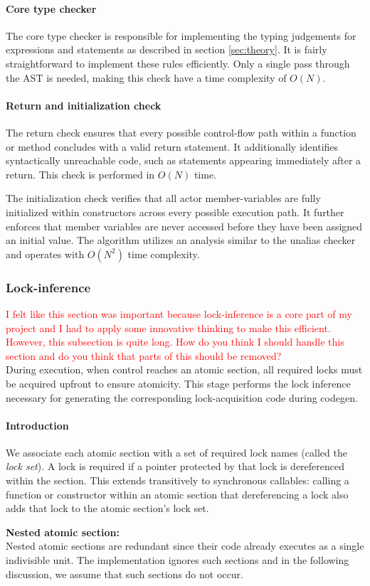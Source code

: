 \documentclass[a4paper,12pt,fleqn]{article}
\begin{document}
\paragraph{Core type checker\\}
The core type checker is responsible for implementing the typing judgements for expressions and statements as described in section \ref{sec:theory}. It is fairly straightforward to implement these rules efficiently. Only a single pass through the AST is needed, making this check have a time complexity of $O(N)$.
\paragraph{Return and initialization check\\}
The return check ensures that every possible control-flow path within a function or method concludes with a valid return statement. It additionally identifies syntactically unreachable code, such as statements appearing immediately after a return. This check is performed in $O(N)$ time.

The initialization check verifies that all actor member-variables are fully initialized within constructors across every possible execution path. It further enforces that member variables are never accessed before they have been assigned an initial value. The algorithm utilizes an analysis similar to the unalias checker and operates with $O(N^2)$ time complexity.

\subsubsection{Lock-inference}
\textcolor{red}{I felt like this section was important because lock-inference is a core part of my project and I had to apply some innovative thinking to make this efficient. However, this subsection is quite long. How do you think I should handle this section and do you think that parts of this should be removed?}\\
During execution, when control reaches an atomic section, all required locks must be acquired upfront to ensure atomicity. This stage performs the lock inference necessary for generating the corresponding lock-acquisition code during codegen.
\paragraph{Introduction\\}
We associate each atomic section with a set of required lock names (called the \textit{lock set}). A lock is required if a pointer protected by that lock is dereferenced within the section. This extends transitively to synchronous callables: calling a function or constructor within an atomic section that dereferencing a lock also adds that lock to the atomic section's lock set.
\begin{notebox}
  \textbf{Nested atomic section:\\}
  Nested atomic sections are redundant since their code already executes as a single indivisible unit. The implementation ignores such sections and in the following discussion, we assume that such sections do not occur.
\end{notebox}
\end{document}
